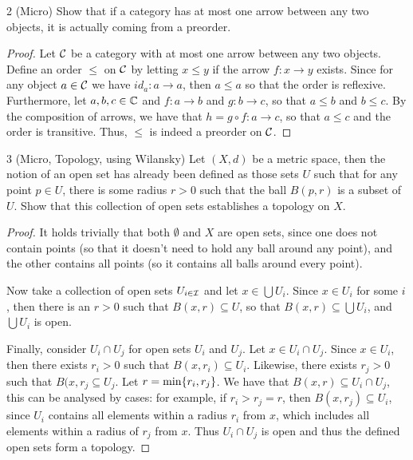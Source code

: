 \begin{exercise}{2 (Micro)}
Show that if a category has at most one arrow between any two objects, it is actually coming from a preorder.
\end{exercise}
\begin{proof}
Let $\mathcal{C}$ be a category with at most one arrow between any two objects.
Define an order $\leq$ on $\mathcal{C}$ by letting $x \leq y$ if the arrow $f: x \to y$ exists.
Since for any object $a \in \mathcal{C}$ we have $id_a: a \to a$, then $a \leq a$ so that the order is reflexive.
Furthermore, let $a, b, c \in \mathbb{C}$ and $f: a \to b$ and $g: b \to c$, so that $a \leq b$ and $b \leq c$.
By the composition of arrows, we have that $h = g \circ f: a \to c$, so that $a \leq c$ and the order is transitive.
Thus, $\leq$ is indeed a preorder on $\mathcal{C}$.
\end{proof} 

\begin{exercise}{3 (Micro, Topology, using Wilansky)}
Let $(X, d)$ be a metric space, then the notion of an open set has already been defined as those sets $U$ such that for any point $p \in U$, there is some radius $r > 0$ such that the ball $B(p,r)$ is a subset of $U$.
Show that this collection of open sets establishes a topology on $X$.
\end{exercise}
\begin{proof}
It holds trivially that both $\emptyset$ and $X$ are open sets, since one does not contain points (so that it doesn't need to hold any ball around any point), and the other contains all points (so it contains all balls around every point).

Now take a collection of open sets $U_{i \in \mathcal{I}}$ and let $x \in \bigcup U_i$.
Since $x \in U_i$ for some $i$, then there is an $r > 0$ such that $B(x, r) \subseteq U$, so that $B(x, r) \subseteq \bigcup U_i$, and $\bigcup U_i$ is open.

Finally, consider $U_i \cap U_j$ for open sets $U_i$ and $U_j$.
Let $x \in U_i \cap U_j$.
Since $x \in U_i$, then there exists $r_i > 0$ such that $B(x, r_i) \subseteq U_i$.
Likewise, there exists $r_j > 0$ such that $B(x, r_j \subseteq U_j$.
Let $r = \min \{r_i, r_j\}$.
We have that $B(x, r) \subseteq U_i \cap U_j$, this can be analysed by cases: 
for example, if $r_i > r_j = r$, then $B(x, r_j) \subseteq U_i$, since $U_i$ contains all elements within a radius $r_i$ from $x$, which includes all elements within a radius of $r_j$ from $x$.
Thus $U_i \cap U_j$ is open and thus the defined open sets form a topology.
\end{proof} 

